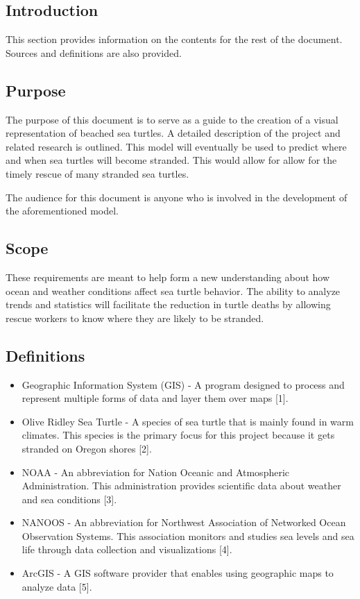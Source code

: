 \documentclass[onecolumn, draftclsnofoot,10pt, compsoc]{IEEEtran}
\begin{document}
\begin{singlespace}
\section{Introduction}
This section provides information on the contents for the rest of the document.  Sources and definitions are also provided.
\subsection{Purpose}
The purpose of this document is to serve as a guide to the creation of a visual representation of beached sea turtles. A detailed description of the project and related research is outlined.  This model will eventually be used to predict where and when sea turtles will become stranded. This would allow for allow for the timely rescue of many stranded sea turtles. \newline 
\par \noindent The audience for this document is anyone who is involved in the development of the aforementioned model.
\subsection{Scope}
    These requirements are meant to help form a new understanding about how ocean and weather conditions affect sea turtle behavior.  The ability to analyze trends and statistics will facilitate the reduction in turtle deaths by allowing rescue workers to know where they are likely to be stranded.
\subsection{Definitions}
    \begin{itemize}
        \item Geographic Information System (GIS) - A program designed to process and represent multiple forms of data
            and layer them over maps [1].
        \item Olive Ridley Sea Turtle - A species of sea turtle that is mainly found in warm climates. This species is the primary focus for this project because it gets stranded on Oregon shores [2].
        \item NOAA - An abbreviation for Nation Oceanic and Atmospheric Administration. This administration provides scientific data about weather and sea conditions [3].
        \item NANOOS - An abbreviation for Northwest Association of Networked Ocean Observation Systems.  This association monitors and studies sea levels and sea life through data collection and visualizations [4].
        \item ArcGIS - A GIS software provider that enables using geographic maps to analyze data [5].
    \end{itemize}

\end{singlespace}
\end{document}
